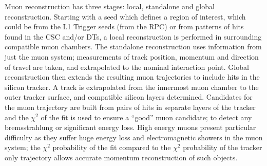Muon reconstruction has three stages: local, standalone and global reconstruction.
Starting with a seed which defines a region of interest, which could be from the \ac{L1} Trigger seeds (from the \ac{RPC}) or from patterns of hits found in the \ac{CSC} and/or \ac{DT}s,
a local reconstruction is performed in surrounding compatible muon chambers.
The standalone reconstruction uses information from just the muon system;
measurements of track position, momentum and direction of travel are taken, and extrapolated to the nominal interaction point. 
Global reconstruction then extends the resulting muon trajectories to include hits in the silicon tracker. A track is extrapolated from the innermost muon chamber to the outer tracker surface, and compatible silicon layers determined.
Candidates for the muon trajectory are built from pairs of hits in separate layers of the tracker 
and the $\chi^{2}$ of the fit is used to ensure a ``good'' muon candidate; to detect any bremsstrahlung or significant energy loss. 
High energy muons present particular difficulty as they suffer huge energy loss and  electromagnetic showers in the muon system; the $\chi^{2}$ probability of the fit compared to the $\chi^{2}$ probability of the tracker only trajectory allows accurate momentum reconstruction of such objects. 








